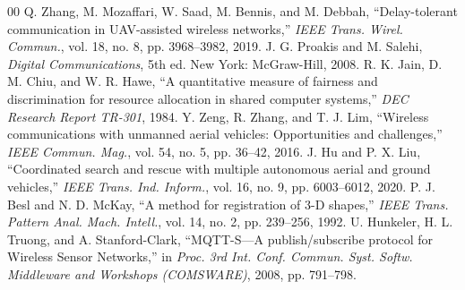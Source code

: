 \documentclass[conference]{IEEEtran}
\begin{document}
\begin{thebibliography}{00}
 Q. Zhang, M. Mozaffari, W. Saad, M. Bennis, and M. Debbah, ``Delay-tolerant communication in UAV-assisted wireless networks,'' \textit{IEEE Trans. Wirel. Commun.}, vol. 18, no. 8, pp. 3968--3982, 2019.
 J. G. Proakis and M. Salehi, \textit{Digital Communications}, 5th ed. New York: McGraw-Hill, 2008.
 R. K. Jain, D. M. Chiu, and W. R. Hawe, ``A quantitative measure of fairness and discrimination for resource allocation in shared computer systems,'' \textit{DEC Research Report TR-301}, 1984.
 Y. Zeng, R. Zhang, and T. J. Lim, ``Wireless communications with unmanned aerial vehicles: Opportunities and challenges,'' \textit{IEEE Commun. Mag.}, vol. 54, no. 5, pp. 36--42, 2016.
 J. Hu and P. X. Liu, ``Coordinated search and rescue with multiple autonomous aerial and ground vehicles,'' \textit{IEEE Trans. Ind. Inform.}, vol. 16, no. 9, pp. 6003--6012, 2020.
 P. J. Besl and N. D. McKay, ``A method for registration of 3-D shapes,'' \textit{IEEE Trans. Pattern Anal. Mach. Intell.}, vol. 14, no. 2, pp. 239--256, 1992.
 U. Hunkeler, H. L. Truong, and A. Stanford-Clark, ``MQTT-S---A publish/subscribe protocol for Wireless Sensor Networks,'' in \textit{Proc. 3rd Int. Conf. Commun. Syst. Softw. Middleware and Workshops (COMSWARE)}, 2008, pp. 791--798.
\end{thebibliography}
\end{document}
